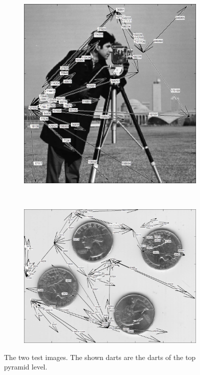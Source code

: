 \documentclass[12pt]{article}
\begin{document}
\begin{figure}[tb]
  \centering

    \begin{subfigure}[b]{0.4\textwidth}
      \includegraphics[width=\textwidth]{img/result.jpg}
      \caption{}\label{fig:result1}
    \end{subfigure}
    ~
    \begin{subfigure}[b]{0.4\textwidth}
      \includegraphics[width=\textwidth]{img/result2.jpg}
      \caption{}\label{fig:result2}
    \end{subfigure}
  \caption{The two test images. The shown darts are the darts of the top pyramid level.}\label{fig:result}
\end{figure}
\end{document}

